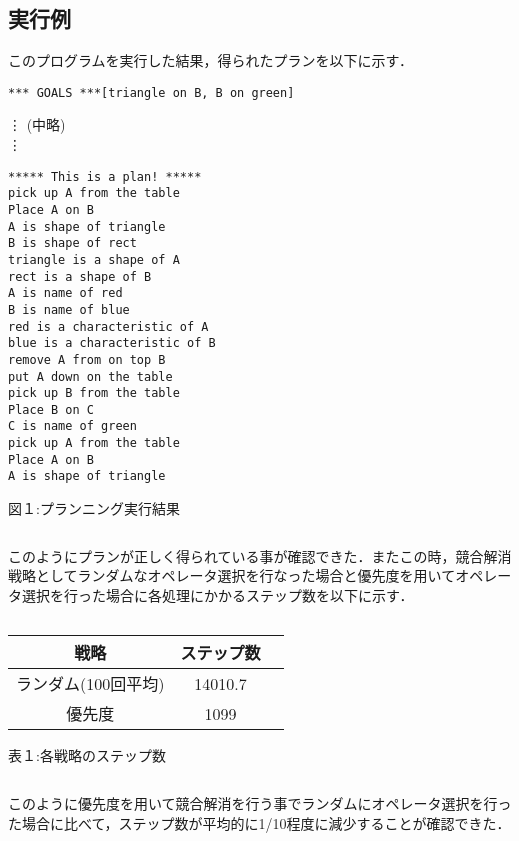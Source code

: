 \documentclass[a4j]{jarticle}
\begin{document}
\subsection{実行例}
このプログラムを実行した結果，得られたプランを以下に示す．
\begin{screen}
\begin{verbatim}
*** GOALS ***[triangle on B, B on green]
\end{verbatim}
\vdots
(中略)\\
\vdots
\begin{verbatim}
***** This is a plan! *****
pick up A from the table
Place A on B
A is shape of triangle
B is shape of rect
triangle is a shape of A
rect is a shape of B
A is name of red
B is name of blue
red is a characteristic of A
blue is a characteristic of B
remove A from on top B
put A down on the table
pick up B from the table
Place B on C
C is name of green
pick up A from the table
Place A on B
A is shape of triangle
\end{verbatim}
\end{screen}
\begin{center}
図１:プランニング実行結果
\end{center}
\begin{verbatim}

\end{verbatim}
このようにプランが正しく得られている事が確認できた．またこの時，競合解消戦略としてランダムなオペレータ選択を行なった場合と優先度を用いてオペレータ選択を行った場合に各処理にかかるステップ数を以下に示す．
\begin{verbatim}

\end{verbatim}
\begin{center}
\begin{tabular}{|c|c|c|}
  \hline
  戦略&ステップ数\\
  \hline
  ランダム(100回平均)&14010.7\\
  \hline
  優先度&1099\\
  \hline
\end{tabular}
\end{center}
\begin{center}
表１:各戦略のステップ数
\end{center}
\begin{verbatim}

\end{verbatim}
このように優先度を用いて競合解消を行う事でランダムにオペレータ選択を行った場合に比べて，ステップ数が平均的に1/10程度に減少することが確認できた．
\end{document}
